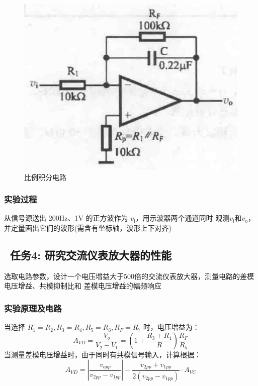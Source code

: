 \documentclass[a4paper,11pt,UTF8]{article}
\begin{document}
\begin{figure}[H]
	\centering
	\includegraphics[scale=0.18]{1.4.png}
	\caption{比例积分电路}
\end{figure}

\subsubsection{实验过程}
从信号源送出 200Hz、1V 的正方波作为 $v_\mathrm{i}$，用示波器两个通道同时
观测$v_\mathrm{i}$和$v_\mathrm{o}$，并定量画出它们的波形(需含有坐标轴，波形上下对齐)

\subsection{ \ 任务4: 研究交流仪表放大器的性能}
选取电路参数，设计一个电压增益大于500倍的交流仪表放大器，测量电路的差模电压增益、共模抑制比和
差模电压增益的幅频响应

\subsubsection{实验原理及电路}
当选择 $R_1 = R_2, R_3 = R_4, R_5 = R_6, R_F = R_7$ 时，电压增益为：
$$
A_{VD} = \frac{V_o}{V_2 - V_1} = (1+\frac{R_3 + R_4}{R})\frac{R_F}{R_5}
$$
当测量差模电压增益时，由于同时有共模信号输入，计算根据：
$$
A_{VD} = |\frac{v_{opp}}{v_{2pp}-v_{1pp}}|-\frac{v_{2pp}+v_{1pp}}{2(v_{2pp} - v_{1pp})} \cdot A_{VC}
$$
\end{document}
